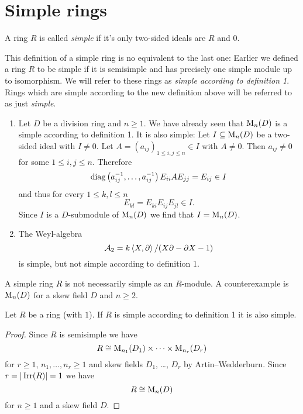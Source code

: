 \section{Simple rings}


\begin{defi}
 A ring $R$ is called \emph{simple} if it’s only two-sided ideals are $R$ and $0$.
\end{defi}


\begin{warn}
 This definition of a simple ring is no equivalent to the last one: Earlier we defined a ring $R$ to be simple if it is semisimple and has precisely one simple module up to isomorphism. We will refer to these rings as \emph{simple according to definition 1}. Rings which are simple according to the new definition above will be referred to as just \emph{simple}.
\end{warn}


\begin{expls}
 \begin{enumerate}[label=\emph{\alph*)},leftmargin=*]
  \item
   Let $D$ be a division ring and $n \geq 1$. We have already seen that $\operatorname{M}_n(D)$ is a simple according to definition 1. It is also simple: Let $I \subseteq \operatorname{M}_n(D)$ be a two-sided ideal with $I \neq 0$. Let $A = (a_{ij})_{1 \leq i,j \leq n} \in I$ with $A \neq 0$. Then $a_{ij} \neq 0$ for some $1 \leq i,j \leq n$. Therefore
   \[
    \operatorname{diag}\left( a_{ij}^{-1}, \dotsc, a_{ij}^{-1} \right) E_{ii} A E_{jj} = E_{ij} \in I
   \]
   and thus for every $1 \leq k,l \leq n$
   \[
    E_{kl} = E_{ki} E_{ij} E_{jl} \in I.
   \]
   Since $I$ is a $D$-submodule of $\operatorname{M}_n(D)$ we find that $I = \operatorname{M}_n(D)$.
  \item
   The Weyl-algebra
   \[
    \mathcal{A}_2 = k \left\langle X,\partial \right\rangle/(X \partial - \partial X - 1)
   \]
   is simple, but not simple according to definition 1.
 \end{enumerate}
\end{expls}


\begin{warn}
 A simple ring $R$ is not necessarily simple as an $R$-module. A counterexample is $\operatorname{M}_n(D)$ for a skew field $D$ and $n \geq 2$.
\end{warn}


\begin{lem}
 Let $R$ be a ring (with $1$). If $R$ is simple according to definition 1 it is also simple.
\end{lem}
\begin{proof}
 Since $R$ is semisimple we have
 \[
  R \cong \operatorname{M}_{n_1}(D_1) \times \dotsb \times \operatorname{M}_{n_r}(D_r)
 \]
 for $r \geq 1$, $n_1, \dotsc, n_r \geq 1$ and skew fields $D_1$, \dots, $D_r$ by Artin--Wedderburn. Since $r = |\operatorname{Irr}(R)| = 1$ we have
 \[
  R \cong \operatorname{M}_n(D)
 \]
 for $n \geq 1$ and a skew field $D$.
\end{proof}


